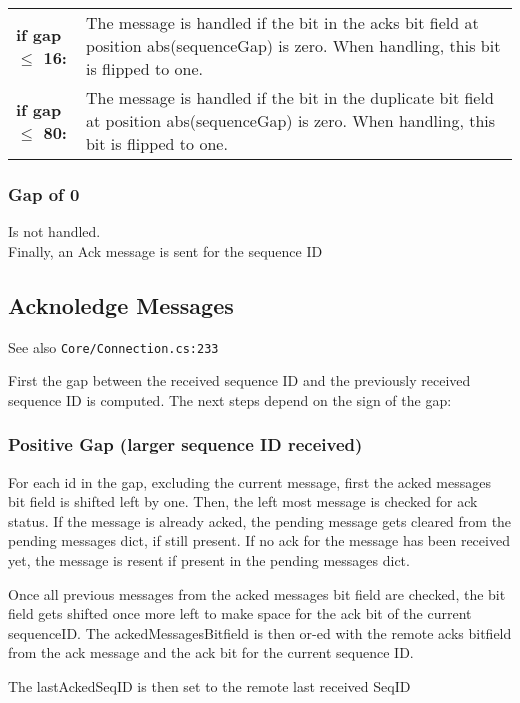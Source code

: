 \begin{tabular}{p{\tableft}p{\tabright}}
	\textbf{if gap $\le$ 16:} & The message is handled if the bit in the acks bit field at position abs(sequenceGap) is zero. When handling, this bit is flipped to one.\\
	\textbf{if gap $\le$ 80:} & The message is handled if the bit in the duplicate bit field at position abs(sequenceGap) is zero. When handling, this bit is flipped to one. \\
\end{tabular}

\subsubsection{Gap of 0}

Is not handled. \\

Finally, an Ack message is sent for the sequence ID

\subsection{Acknoledge Messages}

See also \texttt{Core/Connection.cs:233}

First the gap between the received sequence ID and the previously received sequence ID is computed. The next steps depend on the sign of the gap:

\subsubsection{Positive Gap (larger sequence ID received)}

For each id in the gap, excluding the current message, first the acked messages bit field is shifted left by one. Then, the left most message is checked for ack status. If the message is already acked, the pending message gets cleared from the pending messages dict, if still present. If no ack for the message has been received yet, the message is resent if present in the pending messages dict.

Once all previous messages from the acked messages bit field are checked, the bit field gets shifted once more left to make space for the ack bit of the current sequenceID. The ackedMessagesBitfield is then or-ed with the remote acks bitfield from the ack message and the ack bit for the current sequence ID.

The lastAckedSeqID is then set to the remote last received SeqID

